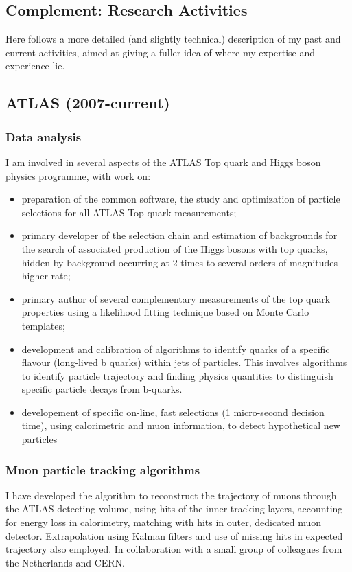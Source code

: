 \documentclass{article}
\begin{document}
\begin{vita}
\section*{Complement: Research Activities}
Here follows a more detailed (and slightly technical) description of my past and current activities, aimed at giving a fuller idea of where my expertise and experience lie.
\subsection*{ATLAS (2007-current)}
\subsubsection*{Data analysis}
I am involved in several aspects of the ATLAS Top quark and Higgs boson physics programme, with work on: 
\begin{itemize}
\item preparation of the common software, the study and optimization of particle selections for all ATLAS Top quark measurements;
\item primary developer of the selection chain and estimation of backgrounds for the search of associated production of the Higgs bosons with top quarks, hidden by background occurring at 2 times to several orders of magnitudes higher rate;
\item primary author of several complementary measurements of the top quark properties using a likelihood fitting technique based on Monte Carlo templates; 
\item development and calibration of algorithms to identify quarks of a specific flavour (long-lived b quarks) within jets of particles. This involves algorithms to identify particle trajectory and finding physics quantities to distinguish specific particle decays from b-quarks. 
\item developement of specific on-line, fast selections (1 micro-second decision time), using calorimetric and muon information, to detect hypothetical new particles
\end{itemize}
\subsubsection*{Muon particle tracking algorithms}
I have developed the algorithm to reconstruct the trajectory of muons through the ATLAS detecting volume, using hits of the inner tracking layers, accounting for energy loss in calorimetry, matching with hits in outer, dedicated muon detector. Extrapolation using Kalman filters and use of missing hits in expected trajectory also employed. In collaboration with a small group of colleagues from the Netherlands and CERN.

\end{vita}
\end{document}
